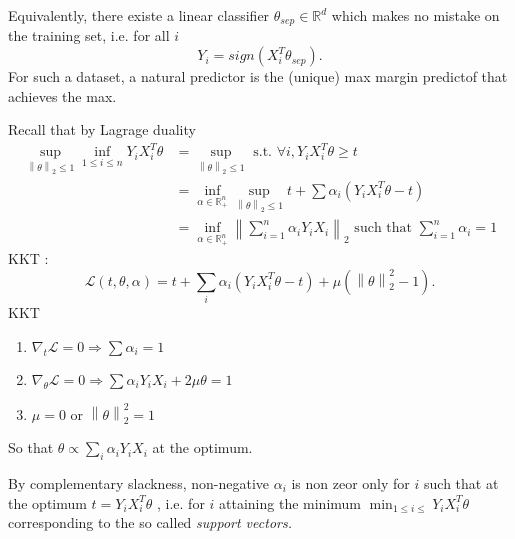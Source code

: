 Equivalently, there existe a linear classifier $ \theta _{sep} \in \mathbb{R}^d $ which makes no mistake on the training set, i.e. for all $ i $ 
\[
    Y_i = sign (X_i^T \theta _{sep})
.\]
For such a dataset, a natural predictor is the (unique) max margin predictof that achieves the max.

\begin{figure}[H] %
    \centering
\end{figure}

Recall that by Lagrage duality
\begin{align*}
    \sup _{\left\| \theta  \right\| _2 \leq 1} \inf _{1 \leq i \leq n} Y_i X_i^T \theta 
        &= \sup _{\left\| \theta  \right\| _2 \leq 1} \text{ s.t. } \forall i, Y_i X_i^T \theta \geq t \\
        &= \inf _{\alpha \in \mathbb{R}_+^n} \sup _{\left\| \theta  \right\| _2 \leq 1} t+ \sum \alpha _i (Y_i X_i^T \theta - t) \\
        &= \inf _{\alpha \in \mathbb{R}_+ ^n} \left\| \sum_{i=1}^{n } \alpha _i Y_i X_i  \right\| _2 \text{ such that } \sum_{i=1}^{n} \alpha _i = 1
\end{align*}
KKT : 
\[
    \mathcal{L}(t, \theta , \alpha ) = t + \sum_{i}^{} \alpha _i (Y_i X_i^T \theta  - t ) + \mu ( \left\| \theta  \right\| _2 ^2 - 1)
.\]
KKT
\begin{enumerate}
    \item $ \nabla _t \mathcal{L} = 0 \Rightarrow \sum \alpha _i = 1  $ 
    \item $ \nabla _\theta  \mathcal{L} = 0 \Rightarrow \sum \alpha _i Y_i X_i + 2 \mu \theta = 1  $ 
    \item $ \mu = 0 $ or $ \left\| \theta  \right\| _2 ^2 = 1$ 
\end{enumerate}
So that $ \theta \propto \sum_i \alpha _i Y_i X_i $ at the optimum. 

By complementary slackness, non-negative $ \alpha _i $ is non zeor only for $ i $ such that at the optimum $ t = Y_i X_i^T \theta  $ , i.e. for $ i $ attaining the minimum $ \min _{1 \leq i \leq } Y_i X_i^T \theta  $ corresponding to the so called \textit{support vectors.}
